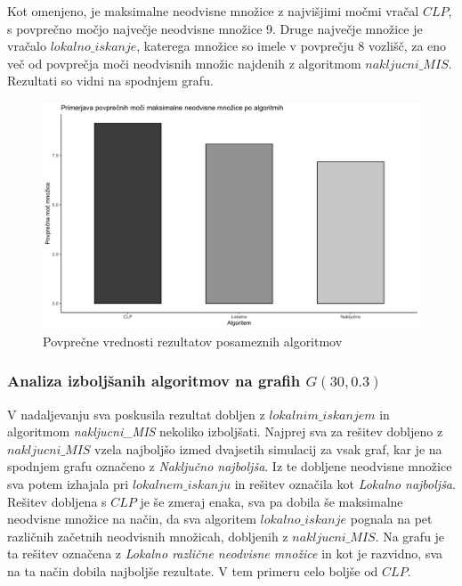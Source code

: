 \documentclass[a4paper, 12pt]{article}
\begin{document}
\noindent Kot omenjeno, je maksimalne neodvisne množice z najvišjimi močmi vračal $CLP$, s povprečno močjo največje neodvisne množice 9. Druge največje množice je vračalo $lokalno\_iskanje$,
katerega množice so imele v povprečju 8 vozlišč, za eno več od povprečja moči neodvisnih množic najdenih z algoritmom $nakljucni\_MIS$. Rezultati so vidni na spodnjem grafu.

\begin{figure}[h!]
	\begin{center}
		\includegraphics[scale=0.10]{R_koda/pon-povpmoc.png}
		\caption{Povprečne vrednosti rezultatov posameznih algoritmov}
	\end{center}
\end{figure}

\subsubsection{Analiza izboljšanih algoritmov na grafih $G(30, 0.3)$}

\noindent V nadaljevanju sva poskusila rezultat dobljen z $lokalnim\_iskanjem$ in algoritmom \textit{nakljucni\_MIS} nekoliko izboljšati. 
Najprej sva za rešitev dobljeno z $nakljucni\_MIS$ vzela najboljšo izmed dvajsetih simulacij za vsak graf, kar je na spodnjem grafu označeno z 
\textit{Naključno najboljša}. Iz te dobljene neodvisne množice sva potem izhajala pri $lokalnem\_iskanju$ in rešitev označila kot
\textit{Lokalno najboljša}. Rešitev dobljena s $CLP$ je še zmeraj enaka, sva pa dobila še maksimalne neodvisne množice na način, da sva algoritem $lokalno\_iskanje$
pognala na pet različnih začetnih neodvisnih množicah, dobljenih z $nakljucni\_MIS$. Na grafu je ta rešitev označena z \textit{Lokalno različne neodvisne množice} in kot je razvidno, 
sva na ta način dobila najboljše rezultate. V tem primeru celo boljše od $CLP$.
\end{document}
